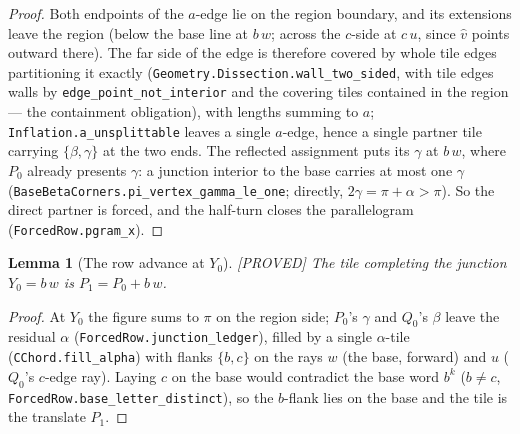 \documentclass[11pt,reqno]{amsart}
\theoremstyle{plain}
\newtheorem{lemma}[theorem]{Lemma}
\theoremstyle{definition}
\newcommand{\lab}[1]{\hfill\textnormal{\footnotesize\textsc{[#1]}}}
\begin{document}
\begin{proof}
Both endpoints of the $a$-edge lie on the region boundary, and its extensions leave the region
(below the base line at $b\,w$; across the $c$-side at $c\,u$, since $\hat v$ points outward
there). The far side of the edge is therefore covered by whole tile edges partitioning it exactly
\textup{(\texttt{Geometry.Dissection.wall\_two\_sided}, with tile edges walls by
\texttt{edge\_point\_not\_interior} and the covering tiles contained in the region --- the
containment obligation)}, with lengths summing to $a$; \texttt{Inflation.a\_unsplittable} leaves a
single $a$-edge, hence a single partner tile carrying $\{\beta,\gamma\}$ at the two ends. The
reflected assignment puts its $\gamma$ at $b\,w$, where $P_0$ already presents $\gamma$: a
junction interior to the base carries at most one $\gamma$
\textup{(\texttt{BaseBetaCorners.pi\_vertex\_gamma\_le\_one}; directly, $2\gamma=\pi+\alpha>\pi$)}.
So the direct partner is forced, and the half-turn closes the parallelogram
\textup{(\texttt{ForcedRow.pgram\_x})}.
\end{proof}

\begin{lemma}[The row advance at $Y_0$]\label{lem:rowp1}\lab{PROVED}
The tile completing the junction $Y_0=b\,w$ is $P_1=P_0+b\,w$.
\end{lemma}

\begin{proof}
At $Y_0$ the figure sums to $\pi$ on the region side; $P_0$'s $\gamma$ and $Q_0$'s $\beta$ leave
the residual $\alpha$ \textup{(\texttt{ForcedRow.junction\_ledger})}, filled by a single
$\alpha$-tile \textup{(\texttt{CChord.fill\_alpha})} with flanks $\{b,c\}$ on the rays $w$ (the
base, forward) and $u$ ($Q_0$'s $c$-edge ray). Laying $c$ on the base would contradict the base
word $b^k$ ($b\neq c$, \texttt{ForcedRow.base\_letter\_distinct}), so the $b$-flank lies on the
base and the tile is the translate $P_1$.
\end{proof}
\end{document}
